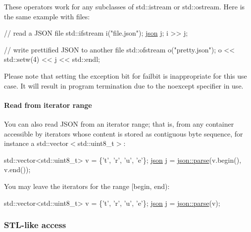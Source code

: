 These operators work for any subclasses of {\ttfamily std\+::istream} or {\ttfamily std\+::ostream}. Here is the same example with files\+:


\begin{DoxyCode}
\textcolor{comment}{// read a JSON file}
std::ifstream i(\textcolor{stringliteral}{"file.json"});
\hyperlink{classnlohmann_1_1basic__json}{json} j;
i >> j;

\textcolor{comment}{// write prettified JSON to another file}
std::ofstream o(\textcolor{stringliteral}{"pretty.json"});
o << std::setw(4) << j << std::endl;
\end{DoxyCode}


Please note that setting the exception bit for {\ttfamily failbit} is inappropriate for this use case. It will result in program termination due to the {\ttfamily noexcept} specifier in use.

\paragraph*{Read from iterator range}

You can also read J\+S\+ON from an iterator range; that is, from any container accessible by iterators whose content is stored as contiguous byte sequence, for instance a {\ttfamily std\+::vector$<$std\+::uint8\+\_\+t$>$}\+:


\begin{DoxyCode}
std::vector<std::uint8\_t> v = \{\textcolor{charliteral}{'t'}, \textcolor{charliteral}{'r'}, \textcolor{charliteral}{'u'}, \textcolor{charliteral}{'e'}\};
\hyperlink{classnlohmann_1_1basic__json}{json} j = \hyperlink{classnlohmann_1_1basic__json_aa9676414f2e36383c4b181fe856aa3c0}{json::parse}(v.begin(), v.end());
\end{DoxyCode}


You may leave the iterators for the range \mbox{[}begin, end)\+:


\begin{DoxyCode}
std::vector<std::uint8\_t> v = \{\textcolor{charliteral}{'t'}, \textcolor{charliteral}{'r'}, \textcolor{charliteral}{'u'}, \textcolor{charliteral}{'e'}\};
\hyperlink{classnlohmann_1_1basic__json}{json} j = \hyperlink{classnlohmann_1_1basic__json_aa9676414f2e36383c4b181fe856aa3c0}{json::parse}(v);
\end{DoxyCode}


\subsubsection*{S\+T\+L-\/like access}

